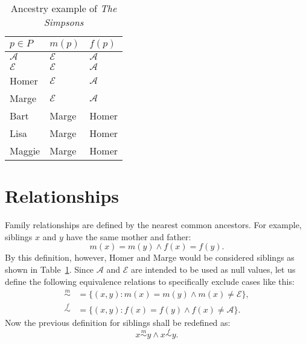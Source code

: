 \documentclass{article}
\begin{document}
\begin{table}
    \centering
    \begin{tabular}{lll}
        \toprule
        \(p \in P\)     & \(m(p)\)        & \(f(p)\)        \\
        \midrule
        \(\mathcal{A}\) & \(\mathcal{E}\) & \(\mathcal{A}\) \\
        \(\mathcal{E}\) & \(\mathcal{E}\) & \(\mathcal{A}\) \\
        Homer           & \(\mathcal{E}\) & \(\mathcal{A}\) \\
        Marge           & \(\mathcal{E}\) & \(\mathcal{A}\) \\
        Bart            & Marge           & Homer           \\
        Lisa            & Marge           & Homer           \\
        Maggie          & Marge           & Homer           \\
        \bottomrule
    \end{tabular}
    \caption{Ancestry example of \textit{The Simpsons}}\label{table:simpsons}
\end{table}

\section{Relationships}

Family relationships are defined by the nearest common ancestors.
For example, siblings \(x\) and \(y\) have the same mother and father:
\[
    m(x) = m(y) \land f(x) = f(y).
\]
By this definition, however, Homer and Marge would be considered siblings as shown in Table~\ref{table:simpsons}.
Since \(\mathcal{A}\) and \(\mathcal{E}\) are intended to be used as null values, let us define the following equivalence relations to specifically exclude cases like this:
\[
    \begin{aligned}
        {\overset{m}{\sim}} & = \{(x, y) : m(x) = m(y) \land m(x) \neq \mathcal{E}\}, \\
        {\overset{f}{\sim}} & = \{(x, y) : f(x) = f(y) \land f(x) \neq \mathcal{A}\}.
    \end{aligned}
\]
Now the previous definition for siblings shall be redefined as:
\[
    x \overset{m}{\sim} y \land x \overset{f}{\sim} y.
\]
\end{document}
